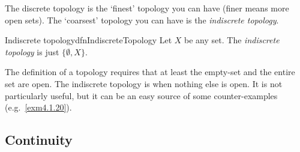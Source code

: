 The discrete topology is the `finest' topology you can have (finer means more open sets).  The `coarsest' topology you can have is the \emph{indiscrete topology}.
\begin{dfn}{Indiscrete topology}{dfnIndiscreteTopology}
Let $X$ be any set.  The \emph{indiscrete topology} is just $\{ \emptyset ,X\}$.
\begin{rmk}
The definition of a topology requires that at least the empty-set and the entire set are open.  The indiscrete topology is when nothing else is open.  It is not particularly useful, but it can be an easy source of some counter-examples (e.g.~\cref{exm4.1.20}).
\end{rmk}
\end{dfn}

\subsection{Continuity}

